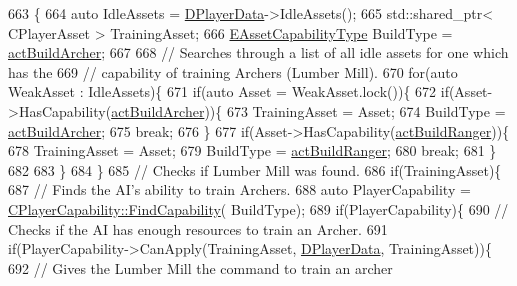 \begin{DoxyCode}
663                                                          \{
664     \textcolor{keyword}{auto} IdleAssets = \hyperlink{classCAIPlayer_a83b5113c8f7e80df54940b647c5ee2e6}{DPlayerData}->IdleAssets();
665     std::shared\_ptr< CPlayerAsset > TrainingAsset;
666     \hyperlink{GameDataTypes_8h_a35b98ce26aca678b03c6f9f76e4778ce}{EAssetCapabilityType} BuildType = \hyperlink{GameDataTypes_8h_a35b98ce26aca678b03c6f9f76e4778ceae3af0123db77607fb381df7e49c5b48b}{actBuildArcher};
667 
668     \textcolor{comment}{// Searches through a list of all idle assets for one which has the }
669     \textcolor{comment}{// capability of training Archers (Lumber Mill).}
670     \textcolor{keywordflow}{for}(\textcolor{keyword}{auto} WeakAsset : IdleAssets)\{
671         \textcolor{keywordflow}{if}(\textcolor{keyword}{auto} Asset = WeakAsset.lock())\{
672             \textcolor{keywordflow}{if}(Asset->HasCapability(\hyperlink{GameDataTypes_8h_a35b98ce26aca678b03c6f9f76e4778ceae3af0123db77607fb381df7e49c5b48b}{actBuildArcher}))\{
673                 TrainingAsset = Asset;
674                 BuildType = \hyperlink{GameDataTypes_8h_a35b98ce26aca678b03c6f9f76e4778ceae3af0123db77607fb381df7e49c5b48b}{actBuildArcher};
675                 \textcolor{keywordflow}{break};
676             \}
677             \textcolor{keywordflow}{if}(Asset->HasCapability(\hyperlink{GameDataTypes_8h_a35b98ce26aca678b03c6f9f76e4778cead539d31a3eb945161800e6342a05fb11}{actBuildRanger}))\{
678                 TrainingAsset = Asset;
679                 BuildType = \hyperlink{GameDataTypes_8h_a35b98ce26aca678b03c6f9f76e4778cead539d31a3eb945161800e6342a05fb11}{actBuildRanger};
680                 \textcolor{keywordflow}{break};
681             \}
682             
683         \}
684     \}
685     \textcolor{comment}{// Checks if Lumber Mill was found.}
686     \textcolor{keywordflow}{if}(TrainingAsset)\{
687         \textcolor{comment}{// Finds the AI's ability to train Archers.}
688         \textcolor{keyword}{auto} PlayerCapability = \hyperlink{classCPlayerCapability_a881ba4b87385d7cfe5cb6ced2d26f226}{CPlayerCapability::FindCapability}(
      BuildType); 
689         \textcolor{keywordflow}{if}(PlayerCapability)\{
690             \textcolor{comment}{// Checks if the AI has enough resources to train an Archer.}
691             \textcolor{keywordflow}{if}(PlayerCapability->CanApply(TrainingAsset, \hyperlink{classCAIPlayer_a83b5113c8f7e80df54940b647c5ee2e6}{DPlayerData}, TrainingAsset))\{
692                 \textcolor{comment}{// Gives the Lumber Mill the command to train an archer}

\end{DoxyCode}
